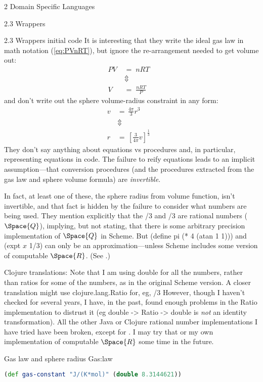 \documentclass[12pt]{PalisadesLakesBook}
\begin{document}
\begin{plSection}{}
\begin{plSection}{2 Domain Specific Languages}
\begin{plSection}{2.3 Wrappers}
\begin{plSection}{2.3 Wrappers initial code}
It is interesting that they write the ideal gas law 
in math notation (\cref{eq:PVnRT}),
but ignore the re-arrangement needed to get volume out:
\begin{align}
\label{eq:PVnRT}
PV \; & = \; nRT \\
& \Updownarrow & \nonumber \\
V \; & = \; \frac{nRT}{P} 
\end{align}
and don't write out the sphere volume-radius constraint 
in any form:
\begin{align}
v \, & = \, \frac{4\pi}{3} r^{3} \\  
& \Updownarrow & \nonumber \\
r \, & = \, \left[ \frac{3}{4\pi} v\right]^{\frac{1}{3}}
\end{align}
They don't say anything about equations vs procedures
and, in particular, representing equations in code.
The failure to reify equations leads to an implicit
assumption---that conversion procedures 
(and the procedures extracted from the gas law and sphere volume
formula) are \emph{invertible}.

In fact, at least one of these, the sphere radius from volume
function, isn't invertible, and that fact is hidden by the
failure to consider what numbers are being used.
They mention explicitly that the {/3} 
and {/3}
are rational numbers ($\Space{Q}$), implying, but not stating,
that there is some arbitrary precision implementation of
$\Space{Q}$ in Scheme.
But {\schemeFont (define pi (* 4 (atan 1 1)))}
and {\schemeFont (expt $x$ 1/3)}
can only be an approximation---unless Scheme includes some version
of computable $\Space{R}$.
(See .)

Clojure translations:
Note that I am using {\javaFont double} for all the numbers,
rather than ratios for some of the numbers,
as in the original Scheme version.
A closer translation might use {\clojureFont clojure.lang.Ratio}
for, eg, {/3}
However, though I haven't checked for several years,
I have, in the past, found enough problems in the 
{\clojureFont Ratio} implementation to distrust it
(eg {\clojureFont double -> Ratio -> double} is \emph{not}
an identity transformation).
All the other Java or Clojure rational number implementations
I have tried have been broken, except for 
.
I may try that or my own implementation 
of computable $\Space{R}$ some time in the future.
\begin{plListing}
{Gas law and sphere radius}
{Gas:law}
\begin{lstlisting}[language=clojure]
(def gas-constant "J/(K*mol)" (double 8.3144621))


\end{lstlisting}
\end{plListing}
\end{plSection}
\end{plSection}
\end{plSection}
\end{plSection}
\end{document}
